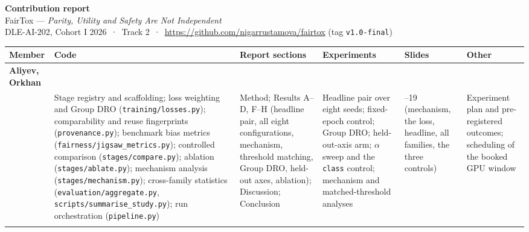 \documentclass[10pt]{article}
\newcommand{\person}[2]{\textbf{#1}\\[0.2ex]{\footnotesize\color{fairgrey}#2}}
\begin{document}
{\Large\bfseries\color{fairblue} Contribution report}\\[0.6ex]
{\normalsize FairTox --- \emph{Parity, Utility and Safety Are Not Independent}}\\[0.3ex]
{\footnotesize\color{fairgrey}
DLE-AI-202, Cohort I 2026 \,·\, Track 2 \,·\,
\url{https://github.com/nigarrustamova/fairtox} (tag \texttt{v1.0-final})}

\vspace{0.8em}

\footnotesize
\renewcommand{\arraystretch}{1.15}
\setlength{\tabcolsep}{4pt}
\begin{tabular}{%
  >{\raggedright\arraybackslash}p{}
  >{\raggedright\arraybackslash}p{}
  >{\raggedright\arraybackslash}p{}
  >{\raggedright\arraybackslash}p{}
  >{\raggedright\arraybackslash}p{}
  >{\raggedright\arraybackslash}p{}}
\toprule
\textbf{Member} & \textbf{Code} & \textbf{Report sections} &
\textbf{Experiments} & \textbf{Slides} & \textbf{Other} \\
\midrule

\person{Aliyev, Orkhan}{\texttt{@mrorxan}} &
Stage registry and scaffolding; loss weighting and Group DRO
(\texttt{training/losses.py}); comparability and reuse fingerprints
(\texttt{provenance.py}); benchmark bias metrics
(\texttt{fairness/jigsaw\_metrics.py}); controlled comparison
(\texttt{stages/compare.py}); ablation (\texttt{stages/ablate.py}); mechanism
analysis (\texttt{stages/mechanism.py}); cross-family statistics
(\texttt{evaluation/aggregate.py}, \texttt{scripts/summarise\_study.py});
run orchestration (\texttt{pipeline.py}) &
Method; Results A--D, F--H (headline pair, all eight configurations, mechanism,
threshold matching, Group DRO, held-out axes, ablation); Discussion;
Conclusion &
Headline pair over eight seeds; fixed-epoch control; Group DRO; held-out-axis
arm; $\alpha$ sweep and the \texttt{class} control; mechanism and
matched-threshold analyses &
15--19 (mechanism, the loss, headline, all families, the three controls) &
Experiment plan and pre-registered outcomes; scheduling of the booked GPU
window \\
\addlinespace


\end{tabular}
\end{document}
